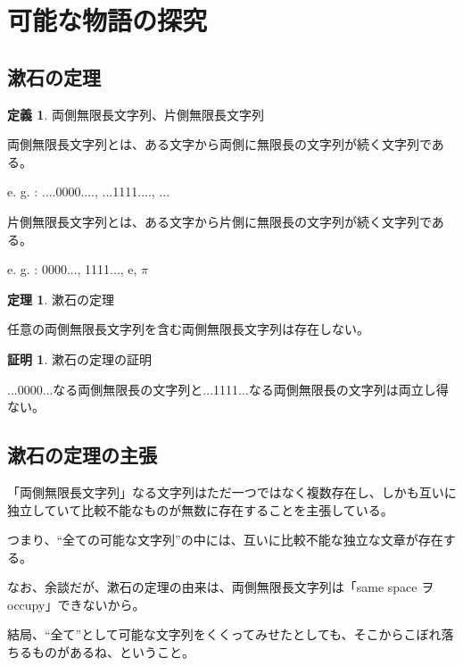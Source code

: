 \documentclass[10pt, a5paper, twoside]{jsarticle}
\theoremstyle{definition}
\newtheorem{dfn}{定義}
\newtheorem{thm}{定理}
\newtheorem{prf}{証明}
\begin{document}
	\section{可能な物語の探究}

		\subsection{漱石の定理}

		\begin{dfn}
			
			両側無限長文字列、片側無限長文字列

			両側無限長文字列とは、ある文字から両側に無限長の文字列が続く文字列である。

			e. g. : ....0000...., ...1111...., ... 

			片側無限長文字列とは、ある文字から片側に無限長の文字列が続く文字列である。

			e. g. : 0000..., 1111..., e, $\pi$
		
		\end{dfn}

		\begin{thm}

			漱石の定理
			
			任意の両側無限長文字列を含む両側無限長文字列は存在しない。
		
		\end{thm}

		\begin{prf}

			漱石の定理の証明

			...0000...なる両側無限長の文字列と...1111...なる両側無限長の文字列は両立し得ない。
		
		\end{prf}

		\subsection{漱石の定理の主張}

		「両側無限長文字列」なる文字列はただ一つではなく複数存在し、しかも互いに独立していて比較不能なものが無数に存在することを主張している。

		つまり、“全ての可能な文字列”の中には、互いに比較不能な独立な文章が存在する。

		なお、余談だが、漱石の定理の由来は、両側無限長文字列は「same space ヲ occupy\cite{ssk}」できないから。

		結局、“全て”として可能な文字列をくくってみせたとしても、そこからこぼれ落ちるものがあるね、ということ。
\end{document}
